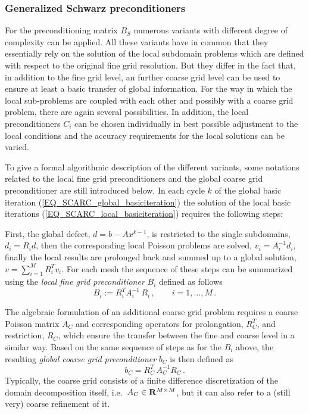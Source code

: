 \subsubsection{Generalized Schwarz preconditioners}
For the preconditioning matrix $B_S$ %
numerous variants with different degree of complexity can be applied.
All these variants have in common that they essentially rely on the solution of the local subdomain problems which are defined with respect to the original fine grid resolution. 
But they differ in the fact that, in addition to the fine grid level, an further coarse grid level can be used to ensure at least a basic transfer of global information. 
%
For the way in which the local sub-problems are coupled with each other and possibly with a coarse grid problem, there are again several possibilities. 
In addition, the local preconditioners $C_i$ can be chosen individually in best possible adjustment to the local conditions and
the accuracy requirements for the local solutions can be varied. 

To give a formal algorithmic description of the different variants, some notations related to the local fine grid preconditioners and the global coarse grid preconditioner are still introduced below.
In each cycle $k$ of the global basic iteration (\ref{EQ_SCARC_global_basiciteration}) 
the solution of the local basic iterations (\ref{EQ_SCARC_local_basiciteration}) requires the following steps: 

First, the global defect, $d = b - Ax^{k-1}$, is restricted to the single subdomains, $d_i=R_i d$, then the corresponding local Poisson problems are solved, $v_i=A_i^{-1}d_i$, finally the local results are  prolonged back and summed up to a global solution, $v=\sum_{i=1}^M R_i^T v_i$. 
For each mesh the sequence of these steps can be summarized using the {\it local fine grid preconditioner} $B_i$ defined as follows
\[ B_i := R_i^T A_i^{-1}\,R_i\,,\qquad i=1,\ldots, M\,. \]


The algebraic formulation of an additional coarse grid problem requires a coarse Poisson matrix $A_C$ and corresponding operators for prolongation, $R_C^T$, and restriction, $R_C$, which ensure the transfer between the fine and coarse level in a similar way.
Based on the same sequence of steps as for the $B_i$ above, the resulting {\it global coarse grid preconditioner} $b_C$ is then defined as
\[ b_C = R_C^T \,A_C^{-1}  R_C\,.\] 
Typically, the coarse grid consists of a finite difference discretization of the domain decomposition itself, i.e.\ $A_C \in {\bf R}^{M \times M}$, but it can also refer to a (still very) coarse refinement of it. 

